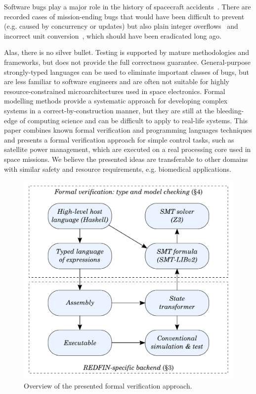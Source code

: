 
Software bugs play a major role in the history of spacecraft
accidents~\cite{Leveson2004}. There are recorded cases of mission-ending bugs
that would have been difficult to prevent (e.g. caused by concurrency
or updates) but also plain integer overflows~\cite{bug-rocket} and incorrect unit
conversion~\cite{NASA:1999:Mars}, which should have been eradicated long ago.

Alas, there is no silver bullet. Testing is supported by mature methodologies
and frameworks, but does not provide the full correctness guarantee. General-purpose
strongly-typed languages can be used to eliminate important classes of bugs, but
are less familiar to software engineers and are often not suitable for highly
resource-constrained microarchitectures used in space electronics. Formal modelling
methods provide a systematic approach for developing complex systems in a
correct-by-construction manner, but they are still at the bleeding-edge of
computing science and can be difficult to apply to real-life systems. This paper
combines known formal verification and programming languages techniques and presents
a formal verification approach for simple control tasks, such as satellite power
management, which are executed on a real processing core used in space missions.
We believe the presented ideas are transferable to other domains with similar
safety and resource requirements, e.g. biomedical applications.
\begin{figure}
\centerline{\includegraphics[scale=0.45]{fig/overview.pdf}}

\caption{Overview of the presented formal verification approach.\label{fig-overview}}

\end{figure}

